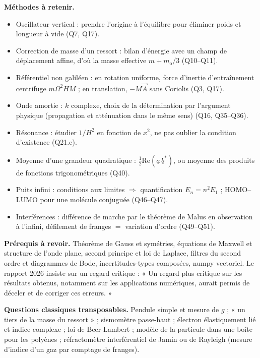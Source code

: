 \documentclass[11pt,a4paper]{article}
\providecommand{\tightlist}{\setlength{\itemsep}{0pt}\setlength{\parskip}{0pt}}
\begin{document}
\textbf{Méthodes à retenir.}

\begin{itemize}
\tightlist
\item
  Oscillateur vertical : prendre l'origine à l'équilibre pour éliminer poids et longueur à vide (Q7, Q17).
\item
  Correction de masse d'un ressort : bilan d'énergie avec un champ de déplacement affine, d'où la masse effective \(m+m_{\mathrm{o}}/3\) (Q10--Q11).
\item
  Référentiel non galiléen : en rotation uniforme, force d'inertie d'entraînement centrifuge \(m\Omega^2HM\) ; en translation, \(-M\vec A\) sans Coriolis (Q3, Q17).
\item
  Onde amortie : \(k\) complexe, choix de la détermination par l'argument physique (propagation et atténuation dans le même sens) (Q16, Q35--Q36).
\item
  Résonance : étudier \(1/H^2\) en fonction de \(x^2\), ne pas oublier la condition d'existence (Q21.e).
\item
  Moyenne d'une grandeur quadratique : \(\frac12\mathrm{Re}(\underline a\,\underline b^*)\), ou moyenne des produits de fonctions trigonométriques (Q40).
\item
  Puits infini : conditions aux limites \(\Rightarrow\) quantification \(E_n=n^2E_1\) ; HOMO--LUMO pour une molécule conjuguée (Q46--Q47).
\item
  Interférences : différence de marche par le théorème de Malus en observation à l'infini, défilement de franges \(=\) variation d'ordre (Q49--Q51).
\end{itemize}

\textbf{Prérequis à revoir.} Théorème de Gauss et symétries, équations de Maxwell et structure de l'onde plane, second principe et loi de Laplace, filtres du second ordre et diagrammes de Bode, incertitudes-types composées, numpy vectoriel. Le rapport 2026 insiste sur un regard critique : « Un regard plus critique sur les résultats obtenus, notamment sur les applications numériques, aurait permis de déceler et de corriger ces erreurs. »

\textbf{Questions classiques transposables.} Pendule simple et mesure de \(g\) ; « un tiers de la masse du ressort » ; sismomètre passe-haut ; électron élastiquement lié et indice complexe ; loi de Beer-Lambert ; modèle de la particule dans une boîte pour les polyènes ; réfractomètre interférentiel de Jamin ou de Rayleigh (mesure d'indice d'un gaz par comptage de franges).
\end{document}
